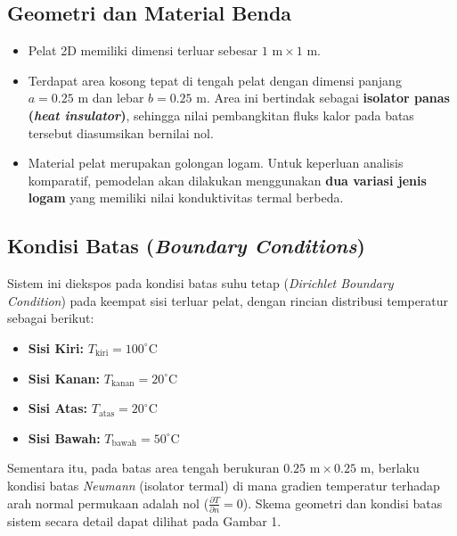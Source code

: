 \documentclass[12pt,a4paper]{article}
\begin{document}
\subsection{Geometri dan Material Benda}
\begin{itemize}
    \item Pelat 2D memiliki dimensi terluar sebesar $1\text{ m} \times 1\text{ m}$.
    \item Terdapat area kosong tepat di tengah pelat dengan dimensi panjang $a = 0.25\text{ m}$ dan lebar $b = 0.25\text{ m}$. Area ini bertindak sebagai \textbf{isolator panas (\textit{heat insulator})}, sehingga nilai pembangkitan fluks kalor pada batas tersebut diasumsikan bernilai nol.
    \item Material pelat merupakan golongan logam. Untuk keperluan analisis komparatif, pemodelan akan dilakukan menggunakan \textbf{dua variasi jenis logam} yang memiliki nilai konduktivitas termal berbeda.
\end{itemize}

\subsection{Kondisi Batas (\textit{Boundary Conditions})}
Sistem ini diekspos pada kondisi batas suhu tetap (\textit{Dirichlet Boundary Condition}) pada keempat sisi terluar pelat, dengan rincian distribusi temperatur sebagai berikut:
\begin{itemize}
    \item \textbf{Sisi Kiri:} $T_{\text{kiri}} = 100^\circ\text{C}$
    \item \textbf{Sisi Kanan:} $T_{\text{kanan}} = 20^\circ\text{C}$
    \item \textbf{Sisi Atas:} $T_{\text{atas}} = 20^\circ\text{C}$
    \item \textbf{Sisi Bawah:} $T_{\text{bawah}} = 50^\circ\text{C}$
\end{itemize}
Sementara itu, pada batas area tengah berukuran $0.25\text{ m} \times 0.25\text{ m}$, berlaku kondisi batas \textit{Neumann} (isolator termal) di mana gradien temperatur terhadap arah normal permukaan adalah nol ($\frac{\partial T}{\partial n} = 0$). Skema geometri dan kondisi batas sistem secara detail dapat dilihat pada Gambar 1.
\end{document}
